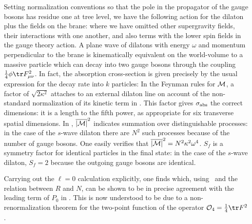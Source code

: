 Setting normalization conventions so that the pole in the propagator of the
gauge bosons has residue one at tree level, we have the following action
for the dilaton plus the fields on the brane:
 where we have omitted other supergravity fields, their interactions with
one another, and also terms with the lower spin fields
in the gauge theory action.  A
plane wave of dilatons with energy $\omega$ and momentum perpendicular to
the brane is kinematically equivalent on the world-volume to a massive
particle which can decay into two 
gauge bosons through the coupling ${1 \over
4} \phi \tr F_{\mu\nu}^2$.  In fact, the absorption cross-section is given
precisely by the usual expression for the decay rate into $k$ particles:
 In the Feynman rules for ${\cal M}$, a factor of $\sqrt{2\kappa^2}$
attaches to an external dilaton line on account of the non-standard
normalization of its kinetic term in \BBAction.  This factor gives
$\sigma_{\rm abs}$ the correct dimensions: it is a length to the fifth
power, as appropriate for six transverse spatial dimensions.  In
\CrossFeynman, $\overline{|{\cal M}|}^2$ indicates summation over
distinguishable processes: in the case of the $s$-wave dilaton there are
$N^2$ such processes because of the number of gauge bosons.  One easily
verifies that $\overline{|{\cal M}|}^2 = N^2 \kappa^2 \omega^4$.  $S_f$ is
a symmetry factor for identical particles in the final state: in the case
of the $s$-wave dilaton, $S_f = 2$ because the outgoing gauge bosons are
identical.

Carrying out the $\ell=0$ calculation explicitly, one finds
 which, using \OptTheorem\ and the relation between $R$ and $N$, 
can be shown to be in precise agreement with the
leading term of $P_0$ in \LowCross.  This is now understood to be due to a
non-renormalization theorem for the two-point function of the operator
${\cal O}_4 = {1 \over 4} \tr F^2$.

